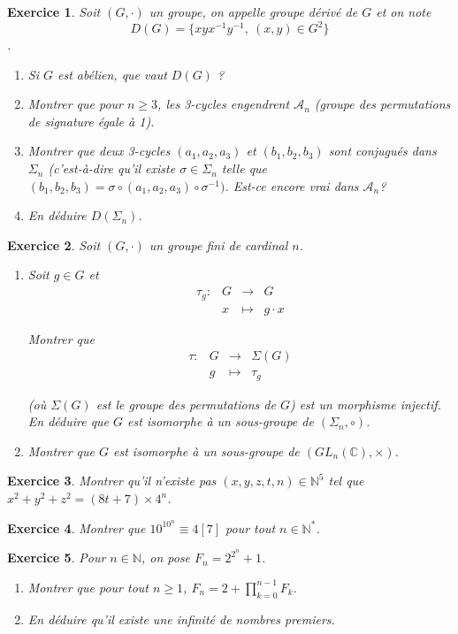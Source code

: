 \documentclass[12pt]{article}
\newtheorem{exercise}{Exercice}[section]
\theoremstyle{remark}
\theoremstyle{remark}
\newcommand{\C}{\mathbb{C}}
\newcommand{\N}{\mathbb{N}}
\newcommand{\function}[5]{
	$$
	\begin{array}{rccl}
		#1: & #2 & \to & #3 \\
		& #4 & \mapsto & #5
	\end{array}
	$$
}
\begin{document}
\begin{exercise}
	Soit $(G,\cdot)$ un groupe, on appelle groupe dérivé de $G$ et on note
	$$D(G)=\{xyx^{-1}y^{-1},~(x,y)\in G^{2}\}$$.
	\begin{enumerate}
		\item Si $G$ est abélien, que vaut $D(G)$ ?
		\item Montrer que pour $n\geqslant3$, les 3-cycles engendrent
		$\mathcal{A}_{n}$ (groupe des permutations de signature égale à 1).
		\item Montrer que deux 3-cycles $(a_{1},a_{2},a_{3})$ et
		$(b_{1},b_{2},b_{3})$ sont conjugués dans $\Sigma_{n}$ (c'est-à-dire
		qu'il existe $\sigma\in\Sigma_{n}$ telle que
		$(b_{1},b_{2},b_{3})=\sigma\circ(a_{1},a_{2},a_{3})\circ\sigma^{-1})$.
		Est-ce encore vrai dans $\mathcal{A}_{n}$?
		\item En déduire $D(\Sigma_{n})$.
	\end{enumerate}
\end{exercise}

\begin{exercise}
	Soit $(G,\cdot)$ un groupe fini de cardinal $n$.
	\begin{enumerate}
		\item Soit $g\in G$ et \function{\tau_g}{G}{G}{x}{g\cdot x}
		Montrer que \function{\tau}{G}{\Sigma(G)}{g}{\tau_g} 
		(où $\Sigma(G)$ est le groupe des permutations de $G$) est un morphisme
		injectif. En déduire que $G$ est isomorphe à un sous-groupe de
		$(\Sigma_{n},\circ)$.
		\item Montrer que $G$ est isomorphe à un sous-groupe de $(GL_{n}(\C),\times)$.
	\end{enumerate}
\end{exercise}

\begin{exercise}
	Montrer qu'il n'existe pas $(x,y,z,t,n)\in \N^{5}$ tel que
	$x^{2}+y^{2}+z^{2}=(8t+7)\times 4^{n}$.
\end{exercise}

\begin{exercise}
	Montrer que $10^{10^{n}}\equiv 4 [7]$ pour tout $n\in\N^{*}$.
\end{exercise}

\begin{exercise}
	Pour $n\in\N$, on pose $F_{n}=2^{2^{n}}+1$.
	\begin{enumerate}
		\item Montrer que pour tout $n\geqslant1$, $F_{n}=2+\prod_{k=0}^{n-1}F_{k}$.
		\item En déduire qu'il existe une infinité de nombres premiers.
	\end{enumerate}
\end{exercise}
\end{document}
